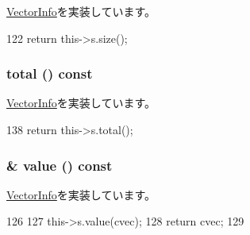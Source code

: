 \hyperlink{classStats_1_1VectorInfo_a4051d143efd31726fa13df03ae4e1bce}{VectorInfo}を実装しています。


\begin{DoxyCode}
122 { return this->s.size(); }
\end{DoxyCode}
\hypertarget{classStats_1_1VectorInfoProxy_a35c6e2ed3fc81b40d69052a062113ead}{
\subsubsection[{total}]{ total () const}}
\label{classStats_1_1VectorInfoProxy_a35c6e2ed3fc81b40d69052a062113ead}


\hyperlink{classStats_1_1VectorInfo_ab152b7e89b37a7db03b04d500ceb8349}{VectorInfo}を実装しています。


\begin{DoxyCode}
138 { return this->s.total(); }
\end{DoxyCode}
\hypertarget{classStats_1_1VectorInfoProxy_a1840628d1aea3c4fe5cf3ae375850a4a}{
\subsubsection[{value}]{\& value () const}}
\label{classStats_1_1VectorInfoProxy_a1840628d1aea3c4fe5cf3ae375850a4a}


\hyperlink{classStats_1_1VectorInfo_a23b21bb9bfe7e45c824c7607a1c301fc}{VectorInfo}を実装しています。


\begin{DoxyCode}
126     {
127         this->s.value(cvec);
128         return cvec;
129     }
\end{DoxyCode}



